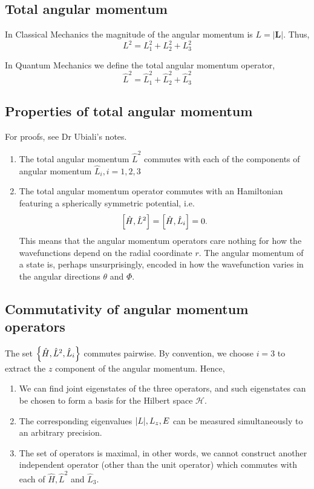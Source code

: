 \documentclass[a4paper,11pt]{article}
\begin{document}
\subsection{Total angular momentum}

In Classical Mechanics the magnitude of the angular momentum is $L=|\mathbf{L}|$. Thus,
\[
L^2=L_1^2+L_2^2+L_3^2
\]
\begin{definition}
	In Quantum Mechanics we define the total angular momentum operator,
	\[
	\hat{L}^2=\hat{L}_1^2+\hat{L}_2^2+\hat{L}_3^2
	\]
\end{definition}

\subsection{Properties of total angular momentum}
For proofs, see Dr Ubiali's notes. 
\begin{enumerate}
	\item The total angular momentum $\hat{L}^2$ commutes with each of the components of angular momentum $\hat{L}_i, i=1,2,3$
	\item The total angular momentum operator commutes with an Hamiltonian featuring a spherically symmetric potential, i.e. 
	\[
		\qty[\hat H, \hat L^2] = \qty[\hat H, \hat L_i] = 0. 
	\]
	This means that the angular momentum operators care nothing for how the wavefunctions depend on the radial coordinate $r$. The angular momentum of a state is, perhaps unsurprisingly, encoded in how the wavefunction varies in the angular directions $\theta$ and $\Phi$.
\end{enumerate}

\subsection{Commutativity of angular momentum operators}
The set \( \qty{ \hat H, \hat L^2, \hat L_i } \) commutes pairwise.
By convention, we choose \( i = 3 \) to extract the \( z \) component of the angular momentum.
Hence,
\begin{enumerate}
	\item We can find joint eigenstates of the three operators, and such eigenstates can be chosen to form a basis for the Hilbert space \( \mathcal H \).
	\item The corresponding eigenvalues \( \abs{L}, L_z, E \) can be measured simultaneously to an arbitrary precision.
	\item The set of operators is maximal, in other words, we cannot construct another independent operator (other than the unit operator) which commutes with each of $\hat{H}, \hat{L}^2$ and $\hat{L}_3$.
\end{enumerate}
\end{document}
